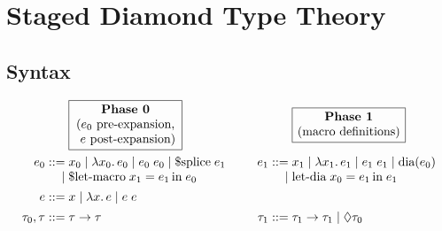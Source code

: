 \documentclass{article}
\begin{document}
\section{Staged Diamond Type Theory}

\subsection{Syntax}

\vspace{2ex}
\noindent
\[\arraycolsep=1.4pt
\begin{array}{rlcrl}
                 & \boxed{\text{\parbox{8.5em}{\centering
                     \textbf{Phase 0}\\
                     ($e_0$ pre-expansion,\\
                     \hphantom{(}$e$ post-expansion)
                   }}}
                 & \hspace{2em} &
                 & \boxed{\text{\parbox{8.5em}{\centering
                     \textbf{Phase 1}\\
                     (macro definitions)
                   }}}
                \vspace{1ex}
                \\
         e_0 ::= & x_0
              \mid \lambda x_0.\,e_0
              \mid e_0\;e_0
              \mid \text{\$splice}\;e_1
                 & \hspace{2em} &
         e_1 ::= & x_1
              \mid \lambda x_1.\,e_1
              \mid e_1\;e_1
              \mid \text{dia}(e_0)
                \\
            \mid & \text{\$let-macro}\;x_1 = e_1\,\text{in}\;e_0
                 & \hspace{2em}
                 & 
            \mid & \text{let-dia}\;x_0 = e_1\,\text{in}\;e_1
                \vspace{1ex}
                \\
           e ::= & x
              \mid \lambda x.\,e
              \mid e\;e
                \vspace{1ex}
                \\
\tau_0, \tau ::= & \tau \to \tau
                 & \hspace{2em} &
      \tau_1 ::= & \tau_1 \to \tau_1
              \mid \Diamond \tau_0

\end{array}\]
\end{document}
